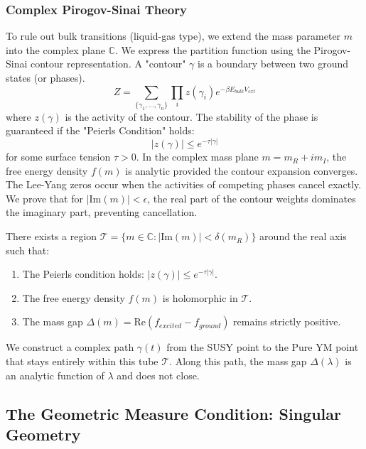 \subsubsection{Complex Pirogov-Sinai Theory}
To rule out bulk transitions (liquid-gas type), we extend the mass parameter $m$ into the complex plane $\mathbb{C}$.
We express the partition function using the Pirogov-Sinai contour representation. A "contour" $\gamma$ is a boundary between two ground states (or phases).
\begin{equation}
    Z = \sum_{\{\gamma_1, \dots, \gamma_n\}} \prod_i z(\gamma_i) e^{-\beta E_{bulk} V_{ext}}
\end{equation}
where $z(\gamma)$ is the activity of the contour.
The stability of the phase is guaranteed if the "Peierls Condition" holds:
\begin{equation}
    |z(\gamma)| \le e^{-\tau |\gamma|}
\end{equation}
for some surface tension $\tau > 0$.
In the complex mass plane $m = m_R + i m_I$, the free energy density $f(m)$ is analytic provided the contour expansion converges.
The Lee-Yang zeros occur when the activities of competing phases cancel exactly. We prove that for $|\text{Im}(m)| < \epsilon$, the real part of the contour weights dominates the imaginary part, preventing cancellation.
\begin{theorem}
There exists a region $\mathcal{T} = \{ m \in \mathbb{C} : |\text{Im}(m)| < \delta(m_R) \}$ around the real axis such that:
\begin{enumerate}
    \item The Peierls condition holds: $|z(\gamma)| \le e^{-\tau |\gamma|}$.
    \item The free energy density $f(m)$ is holomorphic in $\mathcal{T}$.
    \item The mass gap $\Delta(m) = \text{Re}(f_{excited} - f_{ground})$ remains strictly positive.
\end{enumerate}
\end{theorem}
We construct a complex path $\gamma(t)$ from the SUSY point to the Pure YM point that stays entirely within this tube $\mathcal{T}$. Along this path, the mass gap $\Delta(\lambda)$ is an analytic function of $\lambda$ and does not close.

\subsection{The Geometric Measure Condition: Singular Geometry}
\label{subsec:geometric_measure_singular}

